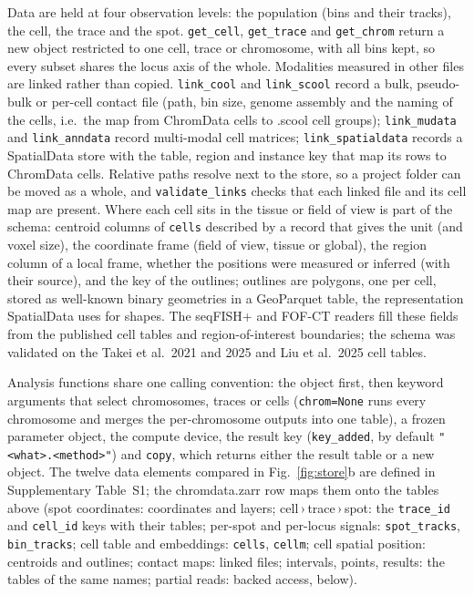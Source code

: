 \documentclass[11pt]{article}
\newcommand{\pkg}[1]{\texttt{#1}}
\begin{document}
Data are held at four observation levels: the population (bins and their tracks), the cell, the trace and the spot.
\pkg{get\_cell}, \pkg{get\_trace} and \pkg{get\_chrom} return a new object restricted to one cell, trace or chromosome, with all bins kept, so every subset shares the locus axis of the whole.
Modalities measured in other files are linked rather than copied.
\pkg{link\_cool} and \pkg{link\_scool} record a bulk, pseudo-bulk or per-cell contact file (path, bin size, genome assembly and the naming of the cells, i.e.\ the map from ChromData cells to .scool cell groups); \pkg{link\_mudata} and \pkg{link\_anndata} record multi-modal cell matrices; \pkg{link\_spatialdata} records a SpatialData store with the table, region and instance key that map its rows to ChromData cells.
Relative paths resolve next to the store, so a project folder can be moved as a whole, and \pkg{validate\_links} checks that each linked file and its cell map are present.
Where each cell sits in the tissue or field of view is part of the schema: centroid columns of \pkg{cells} described by a record that gives the unit (and voxel size), the coordinate frame (field of view, tissue or global), the region column of a local frame, whether the positions were measured or inferred (with their source), and the key of the outlines; outlines are polygons, one per cell, stored as well-known binary geometries in a GeoParquet table, the representation SpatialData uses for shapes.
The seqFISH+ and FOF-CT readers fill these fields from the published cell tables and region-of-interest boundaries; the schema was validated on the Takei et al.\ 2021 and 2025 and Liu et al.\ 2025 cell tables.

Analysis functions share one calling convention: the object first, then keyword arguments that select chromosomes, traces or cells (\pkg{chrom=None} runs every chromosome and merges the per-chromosome outputs into one table), a frozen parameter object, the compute device, the result key (\pkg{key\_added}, by default \pkg{"<what>.<method>"}) and \pkg{copy}, which returns either the result table or a new object.
The twelve data elements compared in Fig.~\ref{fig:store}b are defined in Supplementary Table~S1; the chromdata.zarr row maps them onto the tables above (spot coordinates: coordinates and layers; cell\,›\,trace\,›\,spot: the \pkg{trace\_id} and \pkg{cell\_id} keys with their tables; per-spot and per-locus signals: \pkg{spot\_tracks}, \pkg{bin\_tracks}; cell table and embeddings: \pkg{cells}, \pkg{cellm}; cell spatial position: centroids and outlines; contact maps: linked files; intervals, points, results: the tables of the same names; partial reads: backed access, below).
\end{document}
